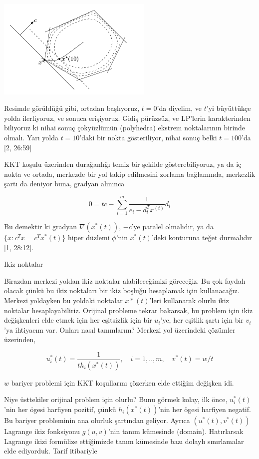 \documentclass[12pt,fleqn]{article}\usepackage{../../common}
\begin{document}
\includegraphics[width=20em]{func_59_barr_03.png}

Resimde görüldüğü gibi, ortadan başlıyoruz, $t=0$'da diyelim, ve $t$'yi
büyüttükçe yolda ilerliyoruz, ve sonuca erişiyoruz. Gidiş pürüzsüz, ve
LP'lerin karakterinden biliyoruz ki nihai sonuç çokyüzlümün (polyhedra)
ekstrem noktalarının birinde olmalı. Yarı yolda $t=10$'daki bir nokta
gösteriliyor, nihai sonuç belki $t=100$'da [2, 26:59]

KKT koşulu üzerinden durağanlığı temiz bir şekilde gösterebiliyoruz, ya da
iç nokta ve ortada, merkezde bir yol takip edilmesini zorlama bağlamında,
merkezlik şartı da deniyor buna, gradyan alınınca

$$
0 = tc - \sum_{i=1}^{m} \frac{1}{e_i - d_t ^T x^(t)} d_i
$$

Bu demektir ki gradyan $\nabla (x^\ast(t))$, $-c$'ye paralel olmalıdır, ya da
$\{ x: c^T x = c^T x^\ast(t) \}$ hiper düzlemi $\phi$'nin $x^\ast(t)$'deki
konturuna teğet durmalıdır [1, 28:12].

Ikiz noktalar

Birazdan merkezi yoldan ikiz noktalar alabileceğimizi göreceğiz. Bu çok
faydalı olacak çünkü bu ikiz noktaları bir ikiz boşluğu hesaplamak için
kullanacağız. Merkezi yoldayken bu yoldaki noktalar $x*(t)$'leri
kullanarak olurlu ikiz noktalar hesaplayabiliriz. Orijinal probleme
tekrar bakarsak, bu problem için ikiz değişkenleri elde etmek için her
eşitsizlik için bir $u_i$'ye, her eşitlik şartı için bir $v_i$'ya ihtiyacım
var. Onları nasıl tanımlarım? Merkezi yol üzerindeki çözümler üzerinden,

$$
u_i^\ast(t) = \frac{1}{t h_i(x^\ast(t))}, \quad i=1,..,m, \quad v^\ast(t) = w/t
$$

$w$ bariyer problemi için KKT koşullarını çözerken elde ettiğim değişken
idi. 

Niye üsttekiler orijinal problem için olurlu? Bunu görmek kolay, ilk önce,
$u_i^\ast(t)$'nin her ögesi harfiyen pozitif, çünkü $h_i(x^\ast(t))$'nin her
ögesi harfiyen negatif. Bu bariyer probleminin ana olurluk şartından
geliyor. Ayrıca $(u^\ast(t),v^\ast(t))$ Lagrange ikiz fonksiyonu $g(u,v)$'nin
tanım kümesinde (domain). Hatırlarsak Lagrange ikizi formülize ettiğimizde
tanım kümesinde bazı dolaylı sınırlamalar elde ediyorduk. Tarif itibariyle
\end{document}
